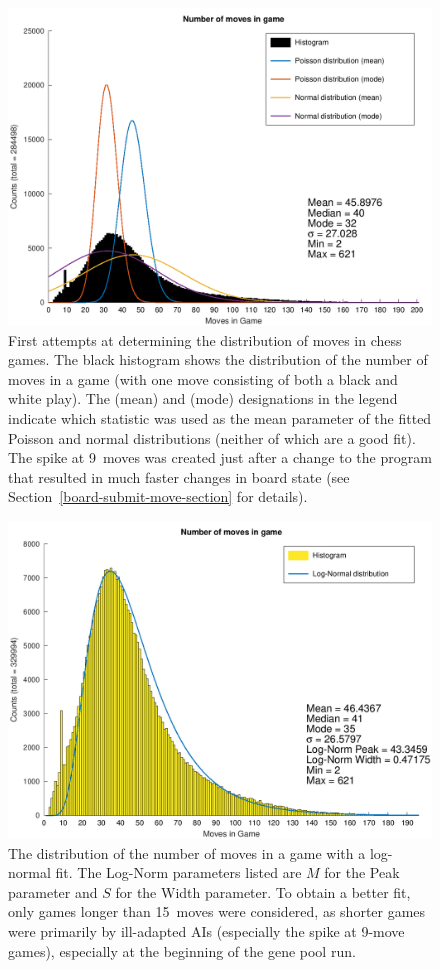 \documentclass[letterpaper]{article}
\renewcommand{\_}{\allowbreak\textunderscore\allowbreak}
\begin{document}
\begin{figure}[tbh]
	\centering
	\includegraphics[width=\textwidth]{game_length_distribution.png}
	\caption{First attempts at determining the distribution of moves in chess games. The black histogram shows the distribution of the number of moves in a game (with one move consisting of both a black and white play). The (mean) and (mode) designations in the legend indicate which statistic was used as the mean parameter of the fitted Poisson and normal distributions (neither of which are a good fit). The spike at 9~moves was created just after a change to the program that resulted in much faster changes in board state (see Section~\ref{board-submit-move-section} for details).}
	\label{game-length-plot}
\end{figure}

\begin{figure}[tbh]
	\centering
	\includegraphics[width=\textwidth]{game_length_log_norm_distribution.png}
	\caption{The distribution of the number of moves in a game with a log-normal fit. The Log-Norm parameters listed are \(M\) for the Peak parameter and \(S\) for the Width parameter. To obtain a better fit, only games longer than 15~moves were considered, as shorter games were primarily by ill-adapted AIs (especially the spike at 9-move games), especially at the beginning of the gene pool run.}
	\label{log-norm-plot}
\end{figure}
\end{document}
